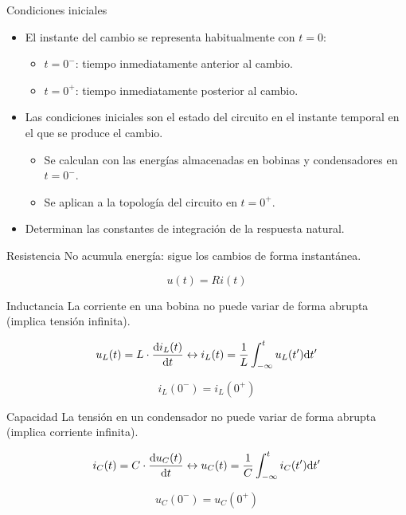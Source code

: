 \documentclass[aspectratio=169, usenames,svgnames,dvipsnames]{beamer}
\begin{document}
\begin{frame}[label={sec:org72a3516}]{Condiciones iniciales}
\begin{itemize}
\item El instante del cambio se representa habitualmente con \(t = 0\):
\begin{itemize}
\item \(t = 0^-\): tiempo inmediatamente anterior al cambio.
\item \(t = 0^+\): tiempo inmediatamente posterior al cambio.
\end{itemize}

\item Las \alert{condiciones iniciales} son el estado del circuito en el instante temporal en el que se produce el cambio.

\begin{itemize}
\item \alert{Se calculan} con las energías almacenadas en bobinas y condensadores en \(t = 0^-\).

\item \alert{Se aplican} a la topología del circuito en \(t = 0^+\).
\end{itemize}

\item Determinan las \alert{constantes de integración} de la respuesta natural.
\end{itemize}
\end{frame}
\begin{frame}[label={sec:orgb137aab}]{Resistencia}
No acumula energía: sigue los cambios de forma instantánea.

\[
u(t) = R i(t)
\]
\end{frame}
\begin{frame}[label={sec:org7f08093}]{Inductancia}
La corriente en una bobina no puede variar de forma abrupta (implica tensión infinita).

\[
u_L(t) = L \cdot \diff{i_L(t)}{t}
\leftrightarrow
i_L(t) = \frac{1}{L} \int^t_{-\infty}u_L(t') \mathrm{d}t'
\]

\[
\boxed{i_L(0^-) = i_L(0^+)}
\]
\end{frame}
\begin{frame}[label={sec:orgc9eb7cd}]{Capacidad}
La tensión en un condensador no puede variar de forma abrupta (implica corriente infinita).

\[
i_C(t) = C \cdot \diff{u_C(t)}{t}
\leftrightarrow
u_C(t) = \frac{1}{C} \int^t_{-\infty}i_C(t') \mathrm{d}t'
\]

\[
\boxed{u_C(0^-) = u_C(0^+)}
\]
\end{frame}
\end{document}
